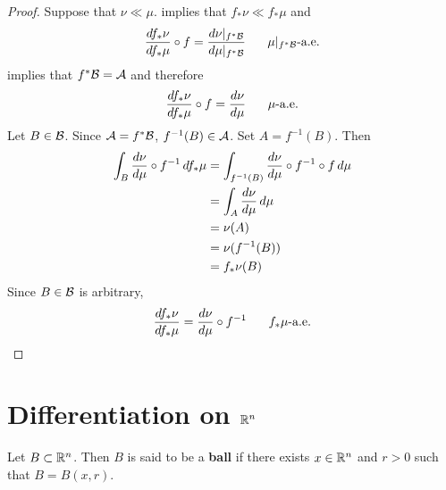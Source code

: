 \documentclass{book}
\begin{document}
	\begin{proof}
		Suppose that $\nu \ll \mu$.  implies that $f_*\nu \ll f_*\mu$ and  
		$$\frac{d f_*\nu}{d f_*\mu} \circ f = \frac{d\nu|_{f^* \mathcal{B}}}{d \mu|_{f^*\mathcal{B}}}  \hspace{.5cm} \text{ $\mu|_{f^*\mathcal{B}}$-a.e.}$$
		 implies that $f^*\mathcal{B} = \mathcal{A}$ and therefore
		$$\frac{d f_*\nu}{d f_*\mu} \circ f = \frac{d\nu}{d \mu}  \hspace{.5cm} \text{ $\mu$-a.e.}$$
		Let $B \in \mathcal{B}$. Since $\mathcal{A} = f^*\mathcal{B}$, $f^{-1}(B) \in \mathcal{A}$. Set $A = f^{-1}(B)$. Then
		\begin{align*}
			\int_{B} \frac{d\nu}{d \mu} \circ f^{-1} \, d f_* \mu 
			& = \int_{f^{-1}(B)} \frac{d\nu}{d \mu} \circ f^{-1} \circ f  \, d \mu \\
			& = \int_{A} \frac{d\nu}{d \mu}  \, d \mu \\
			& = \nu(A) \\
			& = \nu(f^{-1}(B)) \\
			& = f_*\nu(B)
		\end{align*}
		Since $B \in \mathcal{B}$ is arbitrary, 
		$$\frac{d f_*\nu}{d f_*\mu}  = \frac{d\nu}{d \mu} \circ f^{-1} \hspace{.5cm} \text{ $f_*\mu$-a.e.}$$
		
	\end{proof}
	
	
	
	
	
	
	
	
	
	
	
	
	
	
	
	
	
	
	
	
	
	
	
	
	
	

	
	
	
	



	


	
	
	\newpage
	\section{Differentiation on $\mathbb{R}^n$}
	
	\begin{defn}  
		Let $B \subset \mathbb{R}^n$. Then $B$ is said to be a \textbf{ball} if there exists $x \in \mathbb{R}^n$ and $r > 0$ such that $B = B(x, r)$. 
	\end{defn}
	
\end{document}
